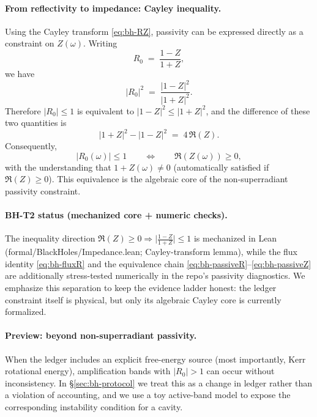 \paragraph{From reflectivity to impedance: Cayley inequality.}
Using the Cayley transform \eqref{eq:bh-RZ}, passivity can be expressed directly as a constraint on $Z(\omega)$. Writing
\[
  R_0 \;=\; \frac{1 - Z}{1 + Z},
\]
we have
\[
  |R_0|^2 \;=\; \frac{|1 - Z|^2}{|1 + Z|^2}.
\]
Therefore $|R_0|\le 1$ is equivalent to $|1 - Z|^2 \le |1 + Z|^2$, and the difference of these two quantities is
\begin{equation}
  |1 + Z|^2 - |1 - Z|^2 \;=\; 4\,\Re(Z).
  \label{eq:bh-cayley-diff}
\end{equation}
Consequently,
\begin{equation}
  |R_0(\omega)| \le 1
  \qquad\Longleftrightarrow\qquad
  \Re(Z(\omega)) \ge 0,
  \label{eq:bh-passiveZ}
\end{equation}
with the understanding that $1+Z(\omega)\neq 0$ (automatically satisfied if $\Re(Z)\ge 0$).
This equivalence is the algebraic core of the non-superradiant passivity constraint.

\paragraph{BH-T2 status (mechanized core + numeric checks).}
The inequality direction $\Re(Z)\ge 0 \Rightarrow \big|\frac{1-Z}{1+Z}\big|\le 1$ is mechanized in Lean (formal/BlackHoles/Impedance.lean; Cayley-transform lemma), while the flux identity \eqref{eq:bh-fluxR} and the equivalence chain \eqref{eq:bh-passiveR}--\eqref{eq:bh-passiveZ} are additionally stress-tested numerically in the repo’s passivity diagnostics. We emphasize this separation to keep the evidence ladder honest: the ledger constraint itself is physical, but only its algebraic Cayley core is currently formalized.

\paragraph{Preview: beyond non-superradiant passivity.}
When the ledger includes an explicit free-energy source (most importantly, Kerr rotational energy), amplification bands with $|R_0|>1$ can occur without inconsistency. In \S\ref{sec:bh-protocol} we treat this as a change in ledger rather than a violation of accounting, and we use a toy active-band model to expose the corresponding instability condition for a cavity.
